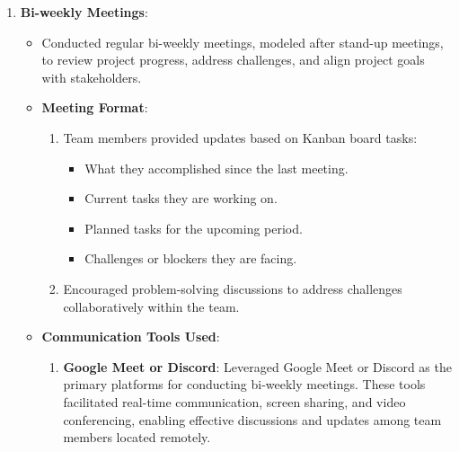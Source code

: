 \begin{enumerate}
    \item \textbf{Bi-weekly Meetings}:
    \begin{itemize}
        \item Conducted regular bi-weekly meetings, modeled after stand-up meetings, to review project progress, address challenges, and align project goals with stakeholders.
        \item \textbf{Meeting Format}:
            \begin{enumerate}
                \item Team members provided updates based on Kanban board tasks:
                    \begin{itemize}
                        \item What they accomplished since the last meeting.
                        \item Current tasks they are working on.
                        \item Planned tasks for the upcoming period.
                        \item Challenges or blockers they are facing.
                    \end{itemize}
                \item Encouraged problem-solving discussions to address challenges collaboratively within the team.
            \end{enumerate}
        \item \textbf{Communication Tools Used}:
            \begin{enumerate}
                \item \textbf{Google Meet or Discord}: Leveraged Google Meet or Discord as the primary platforms for conducting bi-weekly meetings. These tools facilitated real-time communication, screen sharing, and video conferencing, enabling effective discussions and updates among team members located remotely.
            \end{enumerate}
    \end{itemize}



\end{enumerate}
